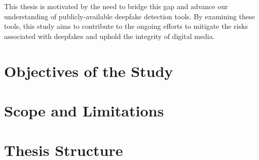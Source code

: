This thesis is motivated by the need to bridge this gap and advance our understanding of
publicly-available deepfake detection tools. By examining these tools, this study aims to
contribute to the ongoing efforts to mitigate the risks associated with deepfakes and uphold
the integrity of digital media.


\section{Objectives of the Study}\label{objective:objectives}
\section{Scope and Limitations}\label{scope:scope}
\section{Thesis Structure}\label{thesis:thesis}

